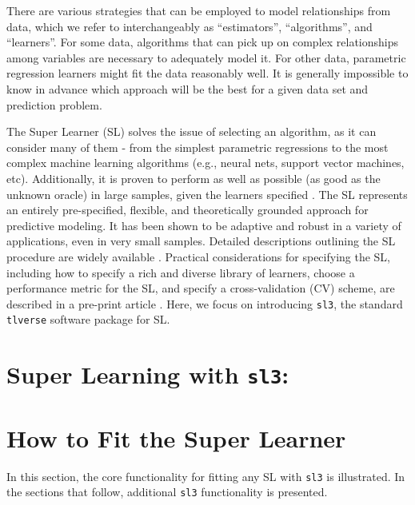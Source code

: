 \documentclass[
  12pt, krantz2,
]{krantz}
\newcommand{\passthrough}[1]{#1}
\newcommand{\1}{\mathbbm{1}}
\theoremstyle{definition}
\theoremstyle{definition}
\theoremstyle{definition}
\theoremstyle{definition}
\theoremstyle{remark}
\begin{document}
There are various strategies that can be employed to model relationships from
data, which we refer to interchangeably as ``estimators'', ``algorithms'', and
``learners''. For some data, algorithms that can pick up on complex relationships
among variables are necessary to adequately model it. For other data, parametric
regression learners might fit the data reasonably well. It is generally
impossible to know in advance which approach will be the best for a given data
set and prediction problem.

The Super Learner (SL) solves the issue of selecting an algorithm, as it can
consider many of them - from the simplest parametric regressions to the most
complex machine learning algorithms (e.g., neural nets, support vector machines,
etc). Additionally, it is proven to perform as well as possible
(as good as the unknown oracle) in large samples, given the learners specified
\citep{vdl2003unified, vdl2004asymptotic, dudoit2005asymptotics, vaart2006oracle}.
The SL represents an entirely pre-specified, flexible, and theoretically
grounded approach for predictive modeling. It has been shown to be adaptive and
robust in a variety of applications, even in very small samples. Detailed
descriptions outlining the SL procedure are widely available \citep{polley2010super, naimi2018stacked}. Practical considerations for specifying the SL, including
how to specify a rich and diverse library of learners, choose a performance
metric for the SL, and specify a cross-validation (CV) scheme, are described in
a pre-print article \citep{rvp2022super}. Here, we focus on introducing \passthrough{\lstinline!sl3!}, the
standard \passthrough{\lstinline!tlverse!} software package for SL.

\hypertarget{super-learning-with-sl3}{%
\section*{\texorpdfstring{Super Learning with \texttt{sl3}:}{Super Learning with sl3:}}\label{super-learning-with-sl3}}


\hypertarget{how-to-fit-the-super-learner}{%
\section{How to Fit the Super Learner}\label{how-to-fit-the-super-learner}}

In this section, the core functionality for fitting any SL with \passthrough{\lstinline!sl3!} is
illustrated. In the sections that follow, additional \passthrough{\lstinline!sl3!} functionality is
presented.
\end{document}
